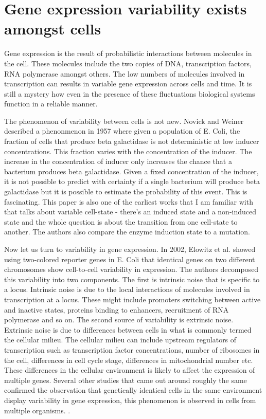 \section{Gene expression variability exists amongst cells}

Gene expression is the result of probabilistic interactions between molecules in the cell. These molecules include the two copies of DNA, transcription factors, RNA polymerase amongst others. The low numbers of molecules involved in transcription can results in  variable gene expression across cells and time. It is still a mystery how even in the presence of these fluctuations  biological systems function in a reliable manner.

The phenomenon of variability between cells is not new. Novick and Weiner \cite{novick_enzyme_1957} \cite{raj_nature_2008} described a phenonmenon in 1957 where given a population of E. Coli, the fraction of cells that produce beta galactidase is not deterministic at low inducer concentrations. This fraction varies with the concentration of the inducer. The increase in the concentration of inducer only increases the chance that a bacterium produces beta galactidase. Given a fixed concentration of the inducer, it is not possible to predict with certainty if a single bacterium will produce beta galactidase but it is possible to estimate the probability of this event. This is fascinating. This paper is also one of the earliest works that I am familiar with that talks about variable cell-state - there's an induced state and a non-induced state and the whole question is about the transition from one cell-state to another. The authors also compare the enzyme induction state to a mutation.

Now let us turn to variability in gene expression. In 2002, Elowitz et al.  \cite{elowitz_stochastic_2002} showed using two-colored reporter genes in E. Coli that identical genes on two different chromosomes show cell-to-cell variability in expression. The authors decomposed this variability into two components. The first is intrinsic noise that is specific to a locus. Intrinsic noise is due to the local interactions of molecules involved in transcription at a locus. These might include promoters switching between active and inactive states, proteins binding to enhancers, recruitment of RNA polymerase and so on. The second source of variability is extrinsic noise. Extrinsic noise is due to differences between cells in what is commonly termed the cellular milieu. The cellular milieu can include upstream regulators of transcription such as transcription factor concentrations, number of ribosomes in the cell, differences in cell cycle stage, differences in mitochondrial number etc. These differences in the cellular environment is likely to affect the expression of multiple genes. Several other studies that came out around roughly the same confirmed the observation that genetically identical cells in the same environment display variability in gene expression, this phenomenon is observed in cells from multiple organisms. \cite{raser_control_2004,blake_phenotypic_2006,blake_noise_2003,raser_noise_2005,volfson_origins_2006}.

